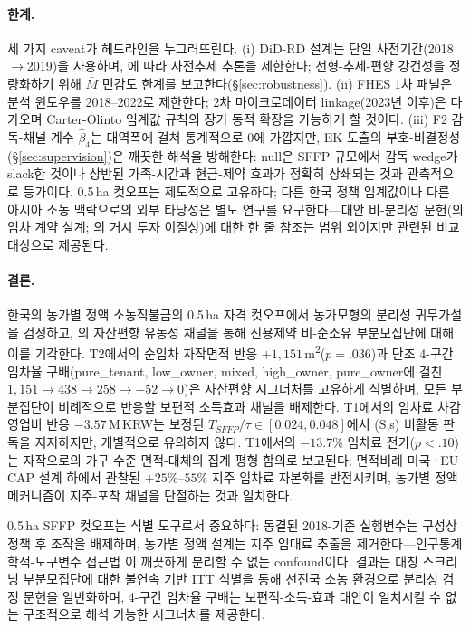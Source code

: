 \documentclass[12pt, a4paper]{article}
\begin{document}
\paragraph{한계.} 세 가지 caveat가 헤드라인을 누그러뜨린다. (i) DiD-RD 설계는 단일 사전기간(2018$\to$2019)을 사용하며, \citet{Roth2022_pretrends}에 따라 사전추세 추론을 제한한다; 선형-추세-편향 강건성을 정량화하기 위해 \citet{RambachanRoth2023_honestdid} $\bar M$ 민감도 한계를 보고한다(\S\ref{sec:robustness}). (ii) FHES 1차 패널은 분석 윈도우를 2018--2022로 제한한다; 2차 마이크로데이터 linkage(2023년 이후)은 다가오며 Carter-Olinto 임계값 규칙의 장기 동적 확장을 가능하게 할 것이다. (iii) F2 감독-채널 계수 $\hat\beta_4$는 대역폭에 걸쳐 통계적으로 0에 가깝지만, EK 도출의 부호-비결정성(\S\ref{sec:supervision})은 깨끗한 해석을 방해한다: null은 SFFP 규모에서 감독 wedge가 slack한 것이나 상반된 가족-시간과 현금-제약 효과가 정확히 상쇄되는 것과 관측적으로 등가이다. 0.5\,ha 컷오프는 제도적으로 고유하다; 다른 한국 정책 임계값이나 다른 아시아 소농 맥락으로의 외부 타당성은 별도 연구를 요구한다---대안 비-분리성 문헌(\citealp{BanerjeeGertlerGhatak2002_tenancy}의 임차 계약 설계; \citealp{KhanThomas2008_idiosyncratic}의 거시 투자 이질성)에 대한 한 줄 참조는 범위 외이지만 관련된 비교 대상으로 제공된다.

\paragraph{결론.}\label{sec:conclusion}
한국의 농가별 정액 소농직불금의 0.5\,ha 자격 컷오프에서 농가모형의 분리성 귀무가설을 검정하고, \citet{CarterOlinto2003_liquidity}의 자산편향 유동성 채널을 통해 신용제약 비-순소유 부분모집단에 대해 이를 기각한다. T2에서의 순임차 자작면적 반응 $+1{,}151$\,m\textsuperscript{2}($p = .036$)과 단조 4-구간 임차율 구배(pure\_tenant, low\_owner, mixed, high\_owner, pure\_owner에 걸친 $1{,}151 \to 438 \to 258 \to -52 \to 0$)은 자산편향 시그너처를 고유하게 식별하며, 모든 부분집단이 비례적으로 반응할 보편적 소득효과 채널을 배제한다. T1에서의 임차료 차감 영업비 반응 $-3.57$\,M\,KRW는 보정된 $T_{SFFP}/\tau \in [0.024, 0.048]$에서 (S,s) 비활동 판독을 지지하지만, 개별적으로 유의하지 않다. T1에서의 $-13.7\%$ 임차료 전가($p < .10$)는 자작으로의 가구 수준 면적-대체의 집계 평형 함의로 보고된다; 면적비례 미국·EU CAP 설계 하에서 관찰된 $+25\%$--$55\%$ 지주 임차료 자본화를 반전시키며, 농가별 정액 메커니즘이 지주-포착 채널을 단절하는 것과 일치한다.

0.5\,ha SFFP 컷오프는 식별 도구로서 중요하다: 동결된 2018-기준 실행변수는 구성상 정책 후 조작을 배제하며, 농가별 정액 설계는 지주 임대료 추출을 제거한다---인구통계학적-도구변수 접근법 \citep{Benjamin1992_separation, LaFaveThomas2016_markets}이 깨끗하게 분리할 수 없는 confound이다. 결과는 대칭 스크리닝 부분모집단에 대한 불연속 기반 ITT 식별을 통해 선진국 소농 환경으로 분리성 검정 문헌을 일반화하며, 4-구간 임차율 구배는 보편적-소득-효과 대안이 일치시킬 수 없는 구조적으로 해석 가능한 시그너처를 제공한다.
\end{document}
